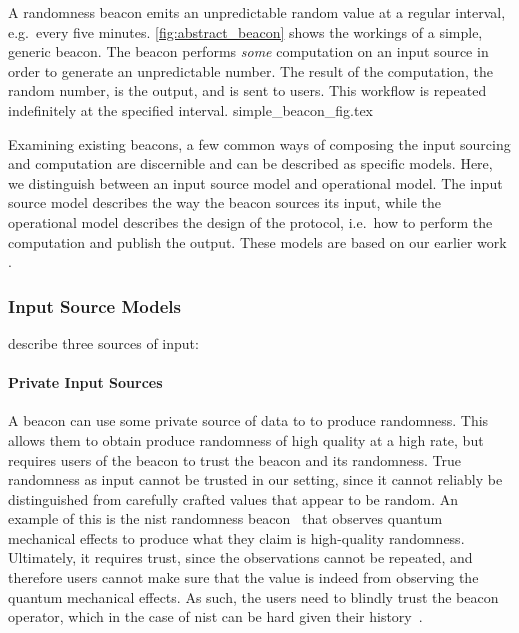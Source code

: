 A randomness beacon emits an unpredictable random value at a regular interval, e.g.\ every five minutes.
\cref{fig:abstract_beacon} shows the workings of a simple, generic beacon.
The beacon performs \emph{some} computation on an input source in order to generate an unpredictable number.
The result of the computation, the random number, is the output, and is sent to users.
This workflow is repeated indefinitely at the specified interval.
{simple_beacon_fig.tex}

Examining existing beacons, a few common ways of composing the input sourcing and computation are discernible and can be described as specific models.
Here, we distinguish between an input source model and operational model.
The input source model describes the way the beacon sources its input, while the operational model describes the design of the protocol, i.e.\ how to perform the computation and publish the output.
These models are based on our earlier work .

\subsubsection{Input Source Models}
 describe three sources of input:

\paragraph{Private Input Sources}
A beacon can use some private source of data to to produce randomness.
This allows them to obtain produce randomness of high quality at a high rate, but requires users of the beacon to trust the beacon and its randomness.
True randomness as input cannot be trusted in our setting, since it cannot reliably be distinguished from carefully crafted values that appear to be random.
An example of this is the \gls{nist} randomness beacon~\cite{nistbeacon} that observes quantum mechanical effects to produce what they claim is high-quality randomness.
Ultimately, it requires trust, since the observations cannot be repeated, and therefore users cannot make sure that the value is indeed from observing the quantum mechanical effects.
As such, the users need to blindly trust the beacon operator, which in the case of \gls{nist} can be hard given their history~\cite{nytimes-nsabackdoors, nytimes-nsaconstants, nist2014backdoor}.

